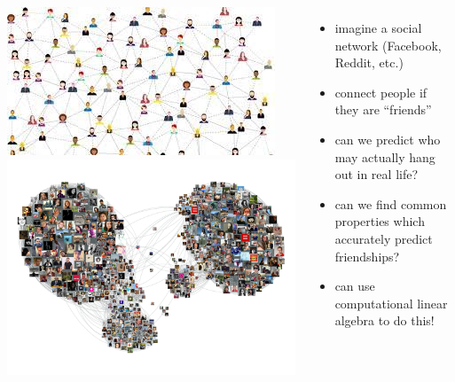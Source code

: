 \documentclass[handout]{beamer}
\begin{document}
\begin{frame}{}
 \begin{columns}
    \centering
             \includegraphics[width=\linewidth]{img/social-network.jpg}
	     \\\vspace{.3in}
             \includegraphics[width=\linewidth]{img/facebook.png}
    \begin{itemize}
      \item imagine a social network (Facebook, Reddit, etc.)
      \item connect people if they are ``friends''
      \item can we predict who may actually hang out in real life?
      \item can we find common properties which accurately predict friendships?
      \item can use computational linear algebra to do this!
    \end{itemize}
 \end{columns} 
\end{frame}
\end{document}
